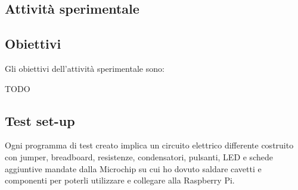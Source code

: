 \documentclass[12pt, a4paper, titlepage, oneside]{book}
\begin{document}
\begin{flushleft}
\chapter{Attività sperimentale}
\section{Obiettivi}
Gli obiettivi dell'attività sperimentale sono:

TODO

\section{Test set-up}
Ogni programma di test creato implica un circuito elettrico differente costruito con jumper, breadboard, resistenze, condensatori, pulsanti, LED e schede aggiuntive mandate dalla Microchip su cui ho dovuto saldare cavetti e componenti per poterli utilizzare e collegare alla Raspberry Pi.\\


\end{flushleft}
\end{document}

